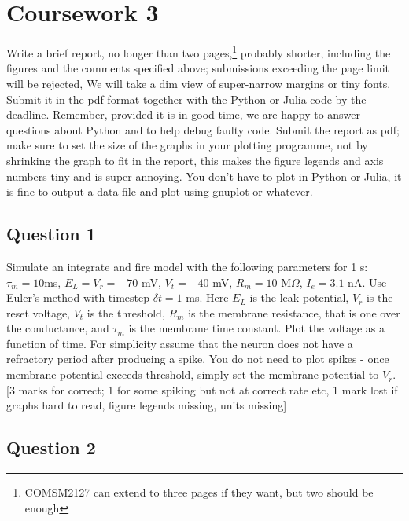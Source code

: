 \documentclass[12pt]{article}
\begin{document}
\section*{Coursework 3}

Write a brief report, no longer than two pages,\footnote{COMSM2127 can extend to three pages if they want, but two should be enough} probably shorter,
including the figures and the comments specified above; submissions
exceeding the page limit will be rejected, We will take a dim view of
super-narrow margins or tiny fonts. Submit it in the pdf format
together with the Python or Julia code by the deadline. Remember,
provided it is in good time, we are happy to answer questions about
Python and to help debug faulty code. Submit the report as pdf; make
sure to set the size of the graphs in your plotting programme, not by
shrinking the graph to fit in the report, this makes the figure
legends and axis numbers tiny and is super annoying. You don't have to
plot in Python or Julia, it is fine to output a data file and plot
using gnuplot or whatever.

\subsection*{Question 1}

Simulate an integrate and fire model with the following parameters for
1 s: $\tau_m = 10 $ms, $E_L = V_r = -70$ mV, $V_t = -40$ mV, $R_m= 10$
M$\Omega$, $I_e = 3.1 $ nA. Use Euler's method with timestep $\delta t
= 1$ ms. Here $E_L$ is the leak potential, $V_r$ is the reset voltage,
$V_t$ is the threshold, $R_m$ is the membrane resistance, that is one
over the conductance, and $\tau_m$ is the membrane time constant. Plot
the voltage as a function of time. For simplicity assume that the
neuron does not have a refractory period after producing a spike. You
do not need to plot spikes - once membrane potential exceeds
threshold, simply set the membrane potential to $V_r$. [3 marks for
  correct; 1 for some spiking but not at correct rate etc, 1 mark lost
  if graphs hard to read, figure legends missing, units missing]

\subsection*{Question 2}
\end{document}
